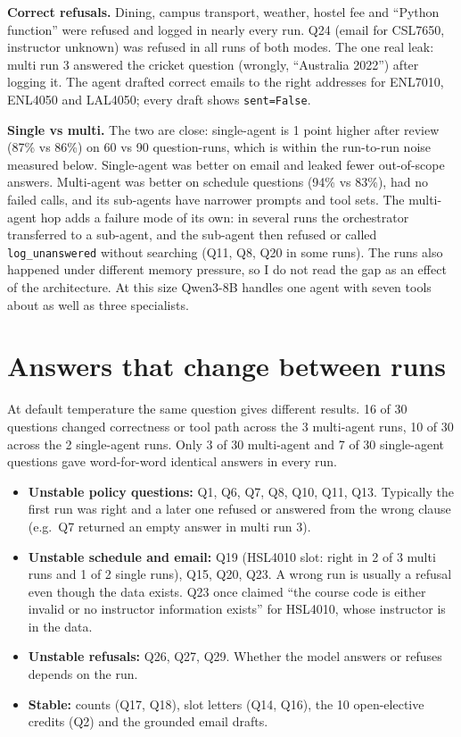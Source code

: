\documentclass[10pt,a4paper]{article}
\newcommand{\code}[1]{\texttt{\small #1}}
\begin{document}
\textbf{Correct refusals.} Dining, campus transport, weather, hostel fee and ``Python function'' were refused and logged in nearly every run. Q24 (email for CSL7650, instructor unknown) was refused in all runs of both modes. The one real leak: multi run 3 answered the cricket question (wrongly, ``Australia 2022'') after logging it. The agent drafted correct emails to the right addresses for ENL7010, ENL4050 and LAL4050; every draft shows \code{sent=False}.

\textbf{Single vs multi.} The two are close: single-agent is 1 point higher after review (87\% vs 86\%) on 60 vs 90 question-runs, which is within the run-to-run noise measured below. Single-agent was better on email and leaked fewer out-of-scope answers. Multi-agent was better on schedule questions (94\% vs 83\%), had no failed calls, and its sub-agents have narrower prompts and tool sets. The multi-agent hop adds a failure mode of its own: in several runs the orchestrator transferred to a sub-agent, and the sub-agent then refused or called \code{log\_unanswered} without searching (Q11, Q8, Q20 in some runs). The runs also happened under different memory pressure, so I do not read the gap as an effect of the architecture. At this size Qwen3-8B handles one agent with seven tools about as well as three specialists.

\section{Answers that change between runs}

At default temperature the same question gives different results. 16 of 30 questions changed correctness or tool path across the 3 multi-agent runs, 10 of 30 across the 2 single-agent runs. Only 3 of 30 multi-agent and 7 of 30 single-agent questions gave word-for-word identical answers in every run.

\begin{itemize}
\item \textbf{Unstable policy questions:} Q1, Q6, Q7, Q8, Q10, Q11, Q13. Typically the first run was right and a later one refused or answered from the wrong clause (e.g.\ Q7 returned an empty answer in multi run 3).
\item \textbf{Unstable schedule and email:} Q19 (HSL4010 slot: right in 2 of 3 multi runs and 1 of 2 single runs), Q15, Q20, Q23. A wrong run is usually a refusal even though the data exists. Q23 once claimed ``the course code is either invalid or no instructor information exists'' for HSL4010, whose instructor is in the data.
\item \textbf{Unstable refusals:} Q26, Q27, Q29. Whether the model answers or refuses depends on the run.
\item \textbf{Stable:} counts (Q17, Q18), slot letters (Q14, Q16), the 10 open-elective credits (Q2) and the grounded email drafts.
\end{itemize}
\end{document}
